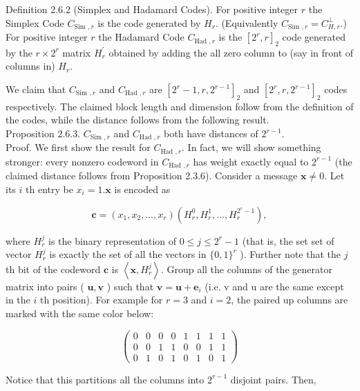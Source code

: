 \documentclass[10pt]{article}
\begin{document}
Definition 2.6.2 (Simplex and Hadamard Codes). For positive integer $r$ the Simplex Code $C_{\text {Sim }, r}$ is the code generated by $H_{r}$. (Equivalently $C_{\text {Sim }, r}=C_{H, r}^{\perp}$.) For positive integer $r$ the Hadamard Code $C_{\text {Had }, r}$ is the $\left[2^{r}, r\right]_{2}$ code generated by the $r \times 2^{r}$ matrix $H_{r}^{\prime}$ obtained by adding the all zero column to (say in front of columns in) $H_{r}$.

We claim that $C_{\text {Sim }, r}$ and $C_{\text {Had }, r}$ are $\left[2^{r}-1, r, 2^{r-1}\right]_{2}$ and $\left[2^{r}, r, 2^{r-1}\right]_{2}$ codes respectively. The claimed block length and dimension follow from the definition of the codes, while the distance follows from the following result.\\
Proposition 2.6.3. $C_{\text {Sim }, r}$ and $C_{\text {Had }, r}$ both have distances of $2^{r-1}$.\\
Proof. We first show the result for $C_{\text {Had }, r}$. In fact, we will show something stronger: every nonzero codeword in $C_{\text {Had }, r}$ has weight exactly equal to $2^{r-1}$ (the claimed distance follows from Proposition 2.3.6). Consider a message $\mathbf{x} \neq 0$. Let its $i$ th entry be $x_{i}=1 . \mathbf{x}$ is encoded as

$$
\mathbf{c}=\left(x_{1}, x_{2}, \ldots, x_{r}\right)\left(H_{r}^{0}, H_{r}^{1}, \ldots, H_{r}^{2^{r}-1}\right),
$$

where $H_{r}^{j}$ is the binary representation of $0 \leq j \leq 2^{r}-1$ (that is, the set set of vector $H_{r}^{j}$ is exactly the set of all the vectors in $\{0,1\}^{r}$ ). Further note that the $j$ th bit of the codeword $\mathbf{c}$ is $\left\langle\mathbf{x}, H_{r}^{j}\right\rangle$. Group all the columns of the generator matrix into pairs ( $\mathbf{u}, \mathbf{v}$ ) such that $\mathbf{v}=\mathbf{u}+\mathbf{e}_{i}$ (i.e. v and u are the same except in the $i$ th position). For example for $r=3$ and $i=2$, the paired up columns are marked with the same color below:

$$
\left(\begin{array}{llllllll}
0 & 0 & 0 & 0 & 1 & 1 & 1 & 1 \\
0 & 0 & 1 & 1 & 0 & 0 & 1 & 1 \\
0 & 1 & 0 & 1 & 0 & 1 & 0 & 1
\end{array}\right)
$$

Notice that this partitions all the columns into $2^{r-1}$ disjoint pairs. Then,
\end{document}
